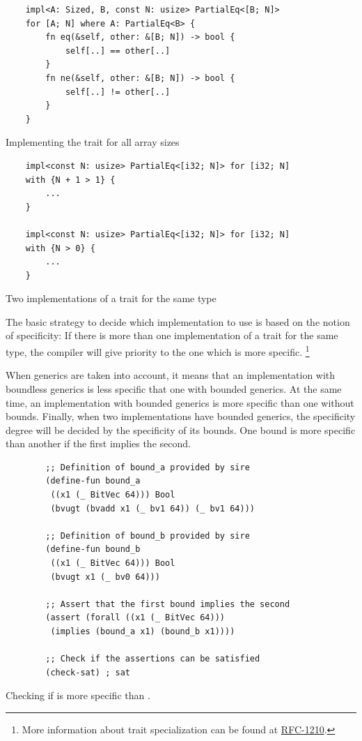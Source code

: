 \begin{listing}[h]
	\begin{verbatim}
    impl<A: Sized, B, const N: usize> PartialEq<[B; N]> 
    for [A; N] where A: PartialEq<B> {
        fn eq(&self, other: &[B; N]) -> bool {
            self[..] == other[..]
        }
        fn ne(&self, other: &[B; N]) -> bool {
            self[..] != other[..]
        }
    }
	\end{verbatim}
    \caption{Implementing the  trait for all array sizes}
  \label{lst:trait_const_generics}
\end{listing}

\begin{listing}[h]
	\begin{verbatim}
    impl<const N: usize> PartialEq<[i32; N]> for [i32; N]
    with {N + 1 > 1} {
        ...
    }
   
    impl<const N: usize> PartialEq<[i32; N]> for [i32; N]
    with {N > 0} {
        ...
    }
	\end{verbatim}
    \caption{Two implementations of a trait for the same type}
  \label{lst:trait_const_generics_spec}
\end{listing}

The basic strategy to decide which implementation to use is based on the notion
of specificity: If there is more than one implementation of a trait for the
same type, the compiler will give priority to the one which is more specific.
\footnote{More information about trait specialization can be found at
\href{https://github.com/rust-lang/rfcs/blob/master/text/1210-impl-specialization.md}{RFC-1210}.}

When generics are taken into account, it means that an implementation with
boundless generics is less specific that one with bounded generics. At the same
time, an implementation with bounded generics is more specific than one without
bounds. Finally, when two implementations have bounded generics, the
specificity degree will be decided by the specificity of its bounds. One bound
is more specific than another if the first implies the second.

\begin{listing}[h]
	\begin{verbatim}
        ;; Definition of bound_a provided by sire
        (define-fun bound_a
         ((x1 (_ BitVec 64))) Bool 
         (bvugt (bvadd x1 (_ bv1 64)) (_ bv1 64)))

        ;; Definition of bound_b provided by sire
        (define-fun bound_b 
         ((x1 (_ BitVec 64))) Bool 
         (bvugt x1 (_ bv0 64)))

        ;; Assert that the first bound implies the second
        (assert (forall ((x1 (_ BitVec 64))) 
         (implies (bound_a x1) (bound_b x1))))

        ;; Check if the assertions can be satisfied
        (check-sat) ; sat
	\end{verbatim}
    \caption{Checking if  is more specific than .}
  \label{lst:trait_spec_smt}
\end{listing}

